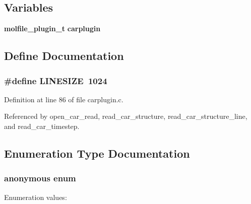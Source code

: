 \subsection*{Variables}
\begin{CompactItemize}
\item 
{\bf molfile\_\-plugin\_\-t} {\bf carplugin}
\end{CompactItemize}


\subsection{Define Documentation}
\subsubsection{\setlength{\rightskip}{0pt plus 5cm}\#define LINESIZE\ 1024}\label{carplugin_8c_a0}




Definition at line 86 of file carplugin.c.

Referenced by open\_\-car\_\-read, read\_\-car\_\-structure, read\_\-car\_\-structure\_\-line, and read\_\-car\_\-timestep.

\subsection{Enumeration Type Documentation}
\subsubsection{\setlength{\rightskip}{0pt plus 5cm}anonymous enum}\label{carplugin_8c_a14}


\begin{Desc}
\item[Enumeration values:]\par
\begin{description}
\item[{\em 
{\em PBC\_\-ON}\label{carplugin_8c_a14a2}
}]\item[{\em 
{\em PBC\_\-OFF}\label{carplugin_8c_a14a3}
}]\item[{\em 
{\em PBC\_\-2D}\label{carplugin_8c_a14a4}
}]\end{description}
\end{Desc}



